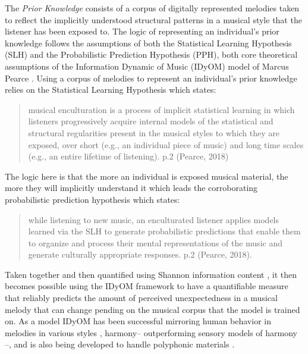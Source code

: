 \documentclass[]{book}
\theoremstyle{definition}
\theoremstyle{definition}
\theoremstyle{definition}
\theoremstyle{remark}
\begin{document}
The \emph{Prior Knowledge} consists of a corpus of digitally represented
melodies taken to reflect the implicitly understood structural patterns
in a musical style that the listener has been exposed to. The logic of
representing an individual's prior knowledge follows the assumptions of
both the Statistical Learning Hypothesis (SLH) and the Probabilistic
Prediction Hypothesis (PPH), both core theoretical assumptions of the
Information Dynamic of Music (IDyOM) model of Marcus Pearce
\citep{pearceConstructionEvaluationStatistical2005, pearceStatisticalLearningProbabilistic2018a}.
Using a corpus of melodies to represent an individual's prior knowledge
relies on the Statistical Learning Hypothesis which states:

\begin{quote}
musical enculturation is a process of implicit statistical learning in
which listeners progressively acquire internal models of the statistical
and structural regularities present in the musical styles to which they
are exposed, over short (e.g., an individual piece of music) and long
time scales (e.g., an entire lifetime of listening). p.2 (Pearce, 2018)
\end{quote}

The logic here is that the more an individual is exposed musical
material, the more they will implicitly understand it which leads the
corroborating probabilistic prediction hypothesis which states:

\begin{quote}
while listening to new music, an enculturated listener applies models
learned via the SLH to generate probabilistic predictions that enable
them to organize and process their mental representations of the music
and generate culturally appropriate responses. p.2 (Pearce, 2018).
\end{quote}

Taken together and then quantified using Shannon information content
\citep{shannonMathematicalTheoryCommunication1948}, it then becomes
possible using the IDyOM framework to have a quantifiable measure that
reliably predicts the amount of perceived unexpectedness in a musical
melody that can change pending on the musical corpus that the model is
trained on. As a model IDyOM has been successful mirroring human
behavior in melodies in various styles
\citep{pearceStatisticalLearningProbabilistic2018a}, harmony--
outperforming \citep{harrisonDissociatingSensoryCognitive2018} sensory
models of harmony \citep{bigandEmpiricalEvidenceMusical2014}--, and is
also being developed to handle polyphonic materials
\citep{sauvePredictionPolyphonyModelling2017}.
\end{document}
